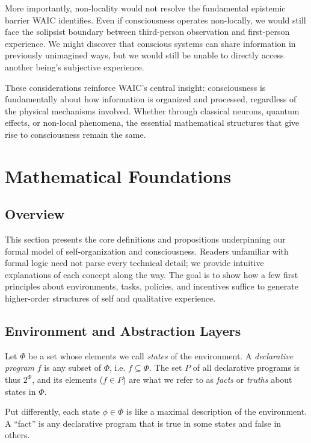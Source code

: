 \documentclass[12pt,letterpaper]{article}
\begin{document}
More importantly, non-locality would not resolve the fundamental epistemic barrier WAIC identifies. Even if consciousness operates non-locally, we would still face the solipsist boundary between third-person observation and first-person experience. We might discover that conscious systems can share information in previously unimagined ways, but we would still be unable to directly access another being's subjective experience.

These considerations reinforce WAIC's central insight: consciousness is fundamentally about how information is organized and processed, regardless of the physical mechanisms involved. Whether through classical neurons, quantum effects, or non-local phenomena, the essential mathematical structures that give rise to consciousness remain the same.

\section{Mathematical Foundations}

\subsection{Overview}

This section presents the core definitions and propositions underpinning our formal model of self-organization and consciousness. Readers unfamiliar with formal logic need not parse every technical detail; we provide intuitive explanations of each concept along the way. The goal is to show how a few first principles about environments, tasks, policies, and incentives suffice to generate higher-order structures of self and qualitative experience.

\subsection{Environment and Abstraction Layers}

\begin{definition}[Environment]\label{def:environment}
Let $\Phi$ be a set whose elements we call \textit{states} of the environment.
A \textit{declarative program} $f$ is any subset of $\Phi$, i.e. $f \subseteq \Phi$.
The set $P$ of all declarative programs is thus $2^\Phi$, and its elements ($f \in P$) are what we refer to as \textit{facts} or \textit{truths} about states in $\Phi$.
\end{definition}

Put differently, each state $\phi \in \Phi$ is like a maximal description of the environment. A ``fact'' is any declarative program that is true in some states and false in others.
\end{document}
